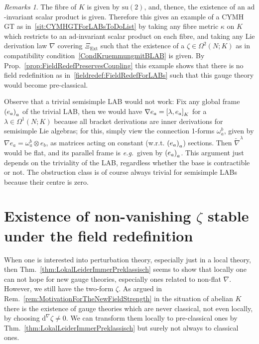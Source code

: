 \documentclass[preprint]{elsarticle}
\theoremstyle{plain}
\theoremstyle{remark}
\newtheorem{remark}[theorem]{Remarks}
\theoremstyle{definition}
\begin{document}
\begin{remark}
\leavevmode\newline
The fibre of $K$ is given by $\mathrm{su}(2)$, and, thence, the existence of an $\mathrm{ad}$-invariant scalar product is given. Therefore this gives an example of a CYMH GT as in~\ref{sit:CYMHGTForLABsToDoList} by taking any fibre metric $\kappa$ on $K$ which restricts to an $\mathrm{ad}$-invariant scalar product on each fibre, and taking any Lie derivation law $\nabla$ covering $\Xi_{\mathrm{Ext}}$ such that the existence of a $\zeta \in \Omega^2(N;K)$ as in compatibility condition~\eqref{CondKruemmungmitBLAB} is given. By Prop.~\ref{prop:FieldRedefPreservesCoupling} this example shows that there is no field redefinition as in~\ref{fieldredef:FieldRedefForLABs} such that this gauge theory would become pre-classical.

Observe that a trivial semisimple LAB would not work: Fix any global frame $\mleft( e_a \mright)_a$ of the trivial LAB, then we would have $\nabla e_a = \mleft[ \lambda , e_a \mright]_K$ for a $\lambda \in \Omega^1(N; K)$ because all bracket derivations are inner derivations for semisimple Lie algebras; for this, simply view the connection 1-forms $\omega_a^b$, given by $\nabla e_a = \omega_a^b \otimes e_b$, as matrices acting on constant (w.r.t. $\mleft( e_a \mright)_a$) sections. Then $\widetilde{\nabla}^\lambda$ would be flat, and its parallel frame is \textit{e.g.}~given by $\mleft( e_a \mright)_a$. This argument just depends on the triviality of the LAB, regardless whether the base is contractible or not. The obstruction class is of course always trivial for semisimple LABs because their centre is zero.
\end{remark}

\section{\texorpdfstring{Existence of non-vanishing $\zeta$ stable under the field redefinition}{Existence of non-vanishing 2-forms with values in the LAB contributing to the field strength, stable under the field redefinition}} \label{NonclassicalStuff}

When one is interested into perturbation theory, especially just in a local theory, then Thm.~\ref{thm:LokalLeiderImmerPreklassisch} seems to show that locally one can not hope for new gauge theories, especially ones related to non-flat $\nabla$. However, we still have the two-form $\zeta$. As argued in Rem.~\ref{rem:MotivationForTheNewFieldStrength} in the situation of abelian $K$ there is the existence of gauge theories which are never classical, not even locally, by choosing $\mathrm{d}^\nabla \zeta \neq 0$. We can transform them locally to pre-classical ones by Thm.~\ref{thm:LokalLeiderImmerPreklassisch} but surely not always to classical ones.
\end{document}
